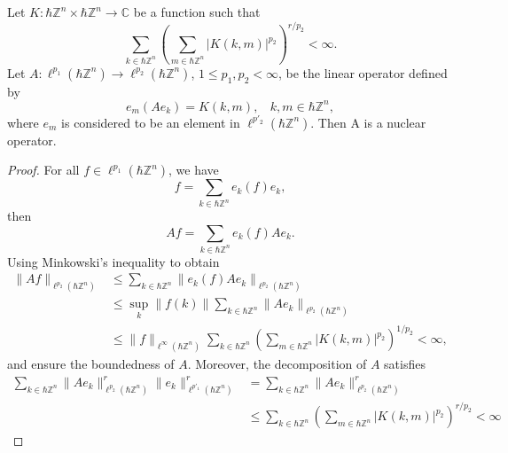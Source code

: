 \documentclass[10pt,a4paper]{amsart}
\begin{document}
\begin{theorem}
    Let $K:\hbar\mathbb{Z}^n\times \hbar\mathbb{Z}^n\to \mathbb{C}$ be a function such that 
    \[\sum_{k\in\hbar\mathbb{Z}^n}\left(\sum_{m\in\hbar\mathbb{Z}^n} |K(k,m)|^{p_2} \right)^{r/p_2} <\infty. \]
    Let $A:\ell^{p_1}(\hbar\mathbb{Z}^n)\to\ell^{p_2}(\hbar\mathbb{Z}^n)$, $1\leq p_1,p_2<\infty$, be the linear operator defined by 
    \[e_m(Ae_k)=K(k,m), \ \ \ \  k,m\in\hbar\mathbb{Z}^n,\]
    where $e_m$ is considered to be an element in $\ell^{p'_2}(\hbar\mathbb{Z}^n)$. Then A is a nuclear operator.
\end{theorem}

\begin{proof}
    For all $f\in\ell^{p_1}(\hbar\mathbb{Z}^n)$, we have
    \[f=\sum_{k\in\hbar\mathbb{Z}^n} e_k(f)e_k, \]
    then 
    \[Af=\sum_{k\in\hbar\mathbb{Z}^n} e_k(f)Ae_k. \]
    Using Minkowski's inequality to obtain 
    \begin{align*}
        \|Af \|_{\ell^{p_2}(\hbar\mathbb{Z}^n)}&\leq \sum_{k\in\hbar\mathbb{Z}^n} \|e_k(f)Ae_k \|_{\ell^{p_2}(\hbar\mathbb{Z}^n)}\\
        &\leq \sup_{k} \|f(k)\| \sum_{k\in\hbar\mathbb{Z}^n} \|Ae_k \|_{\ell^{p_2}(\hbar\mathbb{Z}^n)}\\
        & \leq \|f\|_{\ell^{\infty}(\hbar\mathbb{Z}^n)}  \sum_{k\in\hbar\mathbb{Z}^n}\left(\sum_{m\in\hbar\mathbb{Z}^n} |K(k,m)|^{p_2} \right)^{1/p_2} <\infty,
    \end{align*}
    and ensure the boundedness of  $A$. Moreover, the decomposition of $A$ satisfies 
    \begin{align*}
    \sum_{k\in\hbar\mathbb{Z}^n} \|Ae_k\|^r_{\ell^{p_2}(\hbar\mathbb{Z}^n)} \|e_k\|^r_{\ell^{p'_1}(\hbar\mathbb{Z}^n)}&=\sum_{k\in\hbar\mathbb{Z}^n} \|Ae_k\|^r_{\ell^{p_2}(\hbar\mathbb{Z}^n)}\\
    &\leq \sum_{k\in\hbar\mathbb{Z}^n}\left(\sum_{m\in\hbar\mathbb{Z}^n} |K(k,m)|^{p_2} \right)^{r/p_2}<\infty
    \end{align*}
\end{proof}
\end{document}
